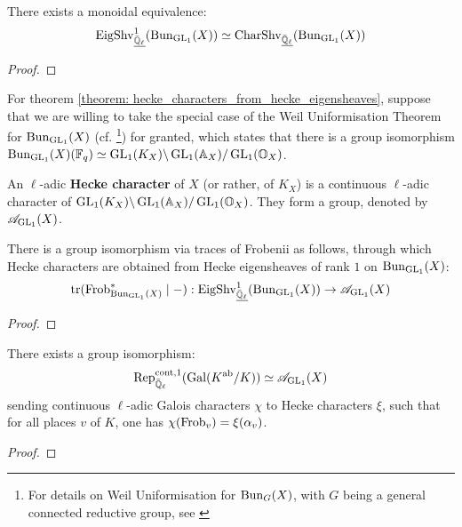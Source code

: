             \begin{lemma} \label{lemma: hecke_eigensheaves_are_character_sheaves}
                There exists a monoidal equivalence:
                    $$\mathrm{Eig}\mathrm{Shv}_{\underline{\bar{\mathbb{Q}}_{\ell}}}^1(\mathrm{Bun}_{\operatorname{GL}_1}(X)) \simeq \mathrm{Char}\mathrm{Shv}_{\underline{\bar{\mathbb{Q}}_{\ell}}}(\mathrm{Bun}_{\operatorname{GL}_1}(X))$$
            \end{lemma}
                \begin{proof}
                    
                \end{proof}
            \begin{convention} \label{conv: weil_uniformisation}
                For theorem \ref{theorem: hecke_characters_from_hecke_eigensheaves}, suppose that we are willing to take the special case of the Weil Uniformisation Theorem for $\mathrm{Bun}_{\operatorname{GL}_1}(X)$ (cf. \cite[Proposition 3.8]{tendler_2015_geometric_class_field_theory}\footnote{For details on Weil Uniformisation for $\mathrm{Bun}_G(X)$, with $G$ being a general connected reductive group, see \cite{sorger_BunG_uniformisation}}) for granted, which states that there is a group isomorphism $\mathrm{Bun}_{\operatorname{GL}_1}(X)(\mathbb{F}_q) \simeq \operatorname{GL}_1(K_X)\backslash\operatorname{GL}_1(\mathbb{A}_X)/\operatorname{GL}_1(\mathbb{O}_{X})$.
            \end{convention}
            \begin{definition} \label{def: hecke_characters}
                An $\ell$-adic \textbf{Hecke character} of $X$ (or rather, of $K_X$) is a continuous $\ell$-adic character of $\operatorname{GL}_1(K_X)\backslash\operatorname{GL}_1(\mathbb{A}_X)/\operatorname{GL}_1(\mathbb{O}_{X})$. They form a group, denoted by $\mathscr{A}_{\operatorname{GL}_1}(X)$.
            \end{definition}
            \begin{theorem} \label{theorem: hecke_characters_from_hecke_eigensheaves}
                There is a group isomorphism via traces of Frobenii as follows, through which Hecke characters are obtained from Hecke eigensheaves of rank $1$ on $\mathrm{Bun}_{\operatorname{GL}_1}(X)$:
                    $$\operatorname{tr}(\mathrm{Frob}_{\mathrm{Bun}_{\operatorname{GL}_1}(X)}^* \mid -): \mathrm{Eig}\mathrm{Shv}_{\underline{\bar{\mathbb{Q}}_{\ell}}}^1(\mathrm{Bun}_{\operatorname{GL}_1}(X)) \to \mathscr{A}_{\operatorname{GL}_1}(X)$$
            \end{theorem}
                \begin{proof}
                    
                \end{proof}
            
            \begin{theorem} \label{theorem: artin_reciprocity_for_global_function_fields}
                There exists a group isomorphism:
                    $$\mathrm{Rep}^{\mathrm{cont}, 1}_{\bar{\mathbb{Q}}_{\ell}}(\mathrm{Gal}(K^{\mathrm{ab}}/K)) \simeq \mathscr{A}_{\operatorname{GL}_1}(X)$$
                sending continuous $\ell$-adic Galois characters $\chi$ to Hecke characters $\xi$, such that for all places $v$ of $K$, one has $\chi(\mathrm{Frob}_v) = \xi(\alpha_v)$.
            \end{theorem}
                \begin{proof}
                    
                \end{proof}